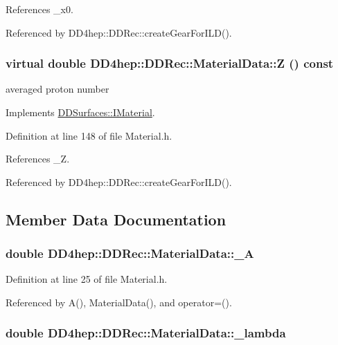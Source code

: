 References \_\-x0.

Referenced by DD4hep::DDRec::createGearForILD().\hypertarget{class_d_d4hep_1_1_d_d_rec_1_1_material_data_a88319ef5ac7fe45c92bcd76bcd863abc}{
\subsubsection[{Z}]{\setlength{\rightskip}{0pt plus 5cm}virtual double DD4hep::DDRec::MaterialData::Z () const}}
\label{class_d_d4hep_1_1_d_d_rec_1_1_material_data_a88319ef5ac7fe45c92bcd76bcd863abc}


averaged proton number 

Implements \hyperlink{class_d_d_surfaces_1_1_i_material_a3e5d3e85db97ff9edb25a073109a14b0}{DDSurfaces::IMaterial}.

Definition at line 148 of file Material.h.

References \_\-Z.

Referenced by DD4hep::DDRec::createGearForILD().

\subsection{Member Data Documentation}
\hypertarget{class_d_d4hep_1_1_d_d_rec_1_1_material_data_a0f26dcc4953ef81b56673d32a3cdd66c}{
\subsubsection[{\_\-A}]{\setlength{\rightskip}{0pt plus 5cm}double {\bf DD4hep::DDRec::MaterialData::\_\-A}}}
\label{class_d_d4hep_1_1_d_d_rec_1_1_material_data_a0f26dcc4953ef81b56673d32a3cdd66c}


Definition at line 25 of file Material.h.

Referenced by A(), MaterialData(), and operator=().\hypertarget{class_d_d4hep_1_1_d_d_rec_1_1_material_data_a7917025516bbbdaa104c86d6e95ddb28}{
\subsubsection[{\_\-lambda}]{\setlength{\rightskip}{0pt plus 5cm}double {\bf DD4hep::DDRec::MaterialData::\_\-lambda}}}
\label{class_d_d4hep_1_1_d_d_rec_1_1_material_data_a7917025516bbbdaa104c86d6e95ddb28}


